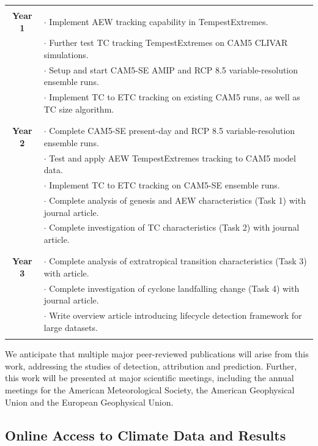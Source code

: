 \documentclass[11pt]{article}
\begin{document}
\begin{tabularx}{\textwidth}{cX}
\hline
\\
\textbf{Year 1} & $\cdot$ Implement AEW tracking capability in TempestExtremes. \\
& $\cdot$ Further test TC tracking TempestExtremes on CAM5 CLIVAR simulations. \\
& $\cdot$ Setup and start CAM5-SE AMIP and RCP 8.5 variable-resolution ensemble runs. \\
& $\cdot$ Implement TC to ETC tracking on existing CAM5 runs, as well as TC size algorithm.\\ 
\\
\hline
\\
\textbf{Year 2} & $\cdot$ Complete CAM5-SE present-day and RCP 8.5 variable-resolution ensemble runs.  \\
& $\cdot$ Test and apply AEW TempestExtremes tracking to CAM5 model data. \\
& $\cdot$ Implement TC to ETC tracking on CAM5-SE ensemble runs.\\
& $\cdot$ Complete analysis of genesis and AEW characteristics (Task 1) with journal article. \\
& $\cdot$ Complete investigation of TC characteristics (Task 2) with journal article. \\
\\
\hline
\\
\textbf{Year 3} & $\cdot$ Complete analysis of extratropical transition characteristics (Task 3) with article. \\ 
& $\cdot$ Complete investigation of cyclone landfalling change (Task 4) with journal article. \\
& $\cdot$ Write overview article introducing lifecycle detection framework for large datasets. \\
\\
\hline
\end{tabularx}

We anticipate that multiple major peer-reviewed publications will arise from this work, addressing the studies of detection, attribution and prediction. Further, this work will be presented at major scientific meetings, including the annual meetings for the American Meteorological Society, the American Geophysical Union and the European Geophysical Union.

\subsection{Online Access to Climate Data and Results}\label{sec:data access}
\end{document}
